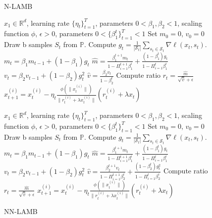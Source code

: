 \begin{figure}
\begin{minipage}[b]{.48\textwidth}

\begin{algorithm}[H]\small
	\caption{N-LAMB}
	\label{alg:nlamb}
	\begin{algorithmic}
		 $x_1 \in \mathbb{R}^d$, learning rate $\{\eta_t\}_{t=1}^T$,  parameters $0 < \beta_{1}, \beta_2 < 1$, scaling function $\phi$, $\epsilon > 0$, parameters $0 < \{\beta_{1}^t\}_{t=1}^T < 1$
		\STATE Set $m_{0} = 0$, $v_{0} = 0$
		\STATE Draw b samples $S_t$ from $\mathbb{P}$.
        \STATE Compute $g_t = \frac{1}{|\mathcal{S}_t|} \sum_{s_t \in \mathcal{S}_t}\nabla \ell(x_t, s_t)$.
		\STATE  $m_{t} = \beta_{1} m_{t-1} + (1 - \beta_{1}) g_{t}$ 
		\STATE $\hat{m} = \frac{\beta_{1}^{t+1} m_t}{1 - {\Pi}_{i=1}^{t+1} \beta_{1}^i} + \frac{(1 - \beta_{1}^{t}) g_t}{1 - {\Pi}_{i=1}^{t} \beta_{1}^i}$
		\STATE  $v_{t} = \beta_{2} v_{t-1} + (1 - \beta_{2}) g_{t}^2$
		\STATE $\hat{v} = \frac{\beta_2 v_t}{1 - {\beta}_2^t}$
		\STATE Compute ratio $r_t = \frac{\hat{m}}{\sqrt{\hat{v}} + \epsilon}$
		\STATE $x_{t+1}^{(i)} = x_{t}^{(i)} - \eta_t \frac{\phi(\|x_t^{(i)}\|)}{\|r_t^{(i)} + \lambda x_t^{(i)}\|} (r_t^{(i)} + \lambda x_t)$
		\ENDFOR
	\end{algorithmic}
\end{algorithm}

\end{minipage}\hfill%
\begin{minipage}[b]{.5\textwidth}

\begin{algorithm}[H]\small
	\caption{NN-LAMB}
	\label{alg:nnlamb}
	\begin{algorithmic}
		 $x_1 \in \mathbb{R}^d$, learning rate $\{\eta_t\}_{t=1}^T$,  parameters $0 < \beta_{1}, \beta_2 < 1$, scaling function $\phi$, $\epsilon > 0$, parameters $0 < \{\beta_{1}^t\}_{t=1}^T < 1$
		\STATE Set $m_{0} = 0$, $v_{0} = 0$
		\FOR{$t=1$ {\bf to} $T$}
		\STATE Draw b samples $S_t$ from $\mathbb{P}$.
        \STATE Compute $g_t = \frac{1}{|\mathcal{S}_t|} \sum_{s_t \in \mathcal{S}_t}\nabla \ell(x_t, s_t)$.
		\STATE  $m_{t} = \beta_{1} m_{t-1} + (1 - \beta_{1}) g_{t}$ 
		\STATE $\hat{m} = \frac{\beta_{1}^{t+1} m_t}{1 - {\Pi}_{i=1}^{t+1} \beta_{1}^i} + \frac{(1 - \beta_{1}^{t}) g_t}{1 - {\Pi}_{i=1}^{t} \beta_{1}^i}$
		\STATE  $v_{t} = \beta_{2} v_{t-1} + (1 - \beta_{2}) g_{t}^2$
		\STATE $\hat{v} = \frac{\beta_{2}^{t+1} v_t}{1 - {\Pi}_{i=1}^{t+1} \beta_{2}^i} + \frac{(1 - \beta_{2}^{t}) g_{t}^2}{1 - {\Pi}_{i=1}^{t} \beta_{2}^i}$
		\STATE Compute ratio $r_t = \frac{\hat{m}}{\sqrt{\hat{v}} + \epsilon}$
		\STATE $x_{t+1}^{(i)} = x_{t}^{(i)} - \eta_t \frac{\phi(\|x_t^{(i)}\|)}{\|r_t^{(i)} + \lambda x_t^{(i)}\|} (r_t^{(i)} + \lambda x_t)$
		\ENDFOR
	\end{algorithmic}
\end{algorithm}


\end{minipage}
\end{figure}
